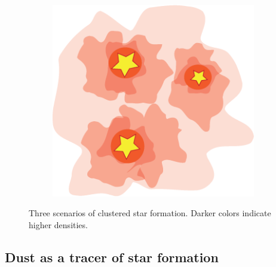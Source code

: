\begin{figure}[ht!]
\begin{center}
\begin{subfigure}[b]{0.3\textwidth}
\caption{}
\label{subfig:scenarios:b}
\end{subfigure}
\begin{subfigure}[b]{0.3\textwidth}
\centering
\includegraphics[width=0.98\textwidth]{Figures/Coalescence.png} 
\caption{}
\label{subfig:scenarios:c}
\end{subfigure}
\caption[Scenarios of clustered star formation]{Three scenarios of clustered star formation. Darker colors indicate higher densities.}
\label{fig:SFscenarios}
\end{center}
\end{figure}



%

\subsection{Dust as a tracer of star formation}
\label{subsec:dust}

